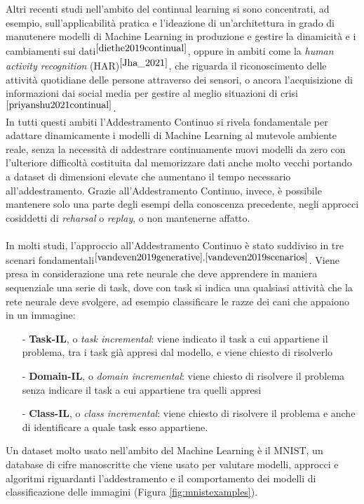 Altri recenti studi nell'ambito del continual learning si sono concentrati, ad esempio, sull'applicabilità pratica e l'ideazione di un'architettura in grado di manutenere modelli di Machine Learning in produzione e gestire la dinamicità e i cambiamenti sui dati$^{\cite{diethe2019continual}}$, oppure in ambiti come la \textit{human activity recognition} (HAR)$^{\cite{Jha_2021}}$, che riguarda il riconoscimento delle attività quotidiane delle persone attraverso dei sensori, o ancora l'acquisizione di informazioni dai social media per gestire al meglio situazioni di crisi$^{\cite{priyanshu2021continual}}$.\\
In tutti questi ambiti l'Addestramento Continuo si rivela fondamentale per adattare dinamicamente i modelli di Machine Learning al mutevole ambiente reale, senza la necessità di addestrare continuamente nuovi modelli da zero con l'ulteriore difficoltà costituita dal memorizzare dati anche molto vecchi portando a dataset di dimensioni elevate che aumentano il tempo necessario all'addestramento. Grazie all'Addestramento Continuo, invece, è possibile mantenere solo una parte degli esempi della conoscenza precedente, negli approcci cosiddetti di \textit{reharsal} o \textit{replay}, o non mantenerne affatto.\\\\
In molti studi, l'approccio all'Addestramento Continuo è stato suddiviso in tre scenari fondamentali$^{\cite{vandeven2019generative},\cite{vandeven2019scenarios}}$. Viene presa in considerazione una rete neurale che deve apprendere in maniera sequenziale una serie di task, dove con task si indica una qualsiasi attività che la rete neurale deve svolgere, ad esempio classificare le razze dei cani che appaiono in un immagine:
\begin{itemize}
    \item[-] \textbf{Task-IL}, o \textit{task incremental}: viene indicato il task a cui appartiene il problema, tra i task già appresi dal modello, e viene chiesto di risolverlo
    \item[-] \textbf{Domain-IL}, o \textit{domain incremental}: viene chiesto di risolvere il problema senza indicare il task a cui appartiene tra quelli appresi
    \item[-] \textbf{Class-IL}, o \textit{class incremental}: viene chiesto di risolvere il problema e anche di identificare a quale task esso appartiene.
\end{itemize}
Un dataset molto usato nell'ambito del Machine Learning è il MNIST, un database di cifre manoscritte che viene usato per valutare modelli, approcci e algoritmi riguardanti l'addestramento e il comportamento dei modelli di classificazione delle immagini (Figura \ref{fig:mnistexamples}).
